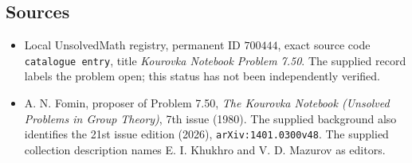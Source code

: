 \documentclass[11pt]{article}
\begin{document}
\subsection{Sources}
\begin{itemize}
\item Local UnsolvedMath registry, permanent ID \(700444\), exact source code \texttt{catalogue entry}, title \emph{Kourovka Notebook Problem 7.50}. The supplied record labels the problem open; this status has not been independently verified.
\item A. N. Fomin, proposer of Problem 7.50, \emph{The Kourovka Notebook (Unsolved Problems in Group Theory)}, 7th issue (1980). The supplied background also identifies the 21st issue edition (2026), \texttt{arXiv:1401.0300v48}. The supplied collection description names E. I. Khukhro and V. D. Mazurov as editors.
\end{itemize}
\end{document}
